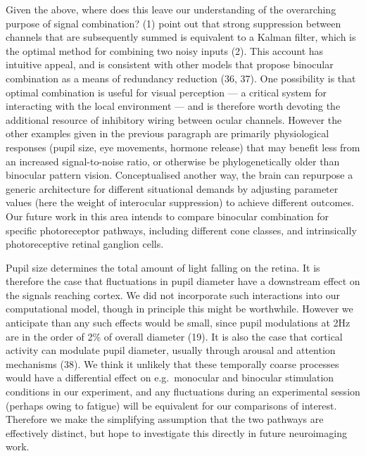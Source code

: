 \documentclass[
]{article}
\begin{document}
Given the above, where does this leave our understanding of the overarching purpose of signal combination? (1) point out that strong suppression between channels that are subsequently summed is equivalent to a Kalman filter, which is the optimal method for combining two noisy inputs (2). This account has intuitive appeal, and is consistent with other models that propose binocular combination as a means of redundancy reduction (36, 37). One possibility is that optimal combination is useful for visual perception --- a critical system for interacting with the local environment --- and is therefore worth devoting the additional resource of inhibitory wiring between ocular channels. However the other examples given in the previous paragraph are primarily physiological responses (pupil size, eye movements, hormone release) that may benefit less from an increased signal-to-noise ratio, or otherwise be phylogenetically older than binocular pattern vision. Conceptualised another way, the brain can repurpose a generic architecture for different situational demands by adjusting parameter values (here the weight of interocular suppression) to achieve different outcomes. Our future work in this area intends to compare binocular combination for specific photoreceptor pathways, including different cone classes, and intrinsically photoreceptive retinal ganglion cells.

Pupil size determines the total amount of light falling on the retina. It is therefore the case that fluctuations in pupil diameter have a downstream effect on the signals reaching cortex. We did not incorporate such interactions into our computational model, though in principle this might be worthwhile. However we anticipate than any such effects would be small, since pupil modulations at 2Hz are in the order of 2\% of overall diameter (19). It is also the case that cortical activity can modulate pupil diameter, usually through arousal and attention mechanisms (38). We think it unlikely that these temporally coarse processes would have a differential effect on e.g.~monocular and binocular stimulation conditions in our experiment, and any fluctuations during an experimental session (perhaps owing to fatigue) will be equivalent for our comparisons of interest. Therefore we make the simplifying assumption that the two pathways are effectively distinct, but hope to investigate this directly in future neuroimaging work.
\end{document}
